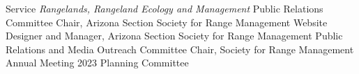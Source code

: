\begin{rubric}{Service}
%
     \emph{Rangelands, Rangeland Ecology and Management}
%
    Public Relations Committee Chair, Arizona Section Society for Range Management
%
\entry*[]
    Website Designer and Manager, Arizona Section Society for Range Management   
%
\entry*[]
    Public Relations and Media Outreach Committee Chair, Society for Range Management Annual Meeting 2023 Planning Committee
%
\end{rubric}